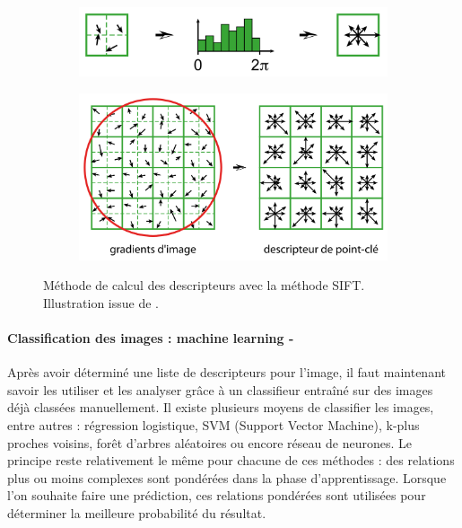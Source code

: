\documentclass[a4paper, 11pt]{article}
\begin{document}
		\begin{figure}\centering
			\begin{subfigure}[c]{.45\linewidth}
				\includegraphics[width=\linewidth]{SIFT-descr02.png}
				\caption{}
			\end{subfigure}
		\begin{subfigure}[c]{.3\linewidth}
			\includegraphics[width=\linewidth]{SIFT-descr01.png}
			\caption{}
		\end{subfigure}
			\caption{\label{fig:sift-descr}Méthode de calcul des descripteurs avec la méthode SIFT. Illustration issue de \cite{frwiki:177813849}.}
		\end{figure}
		\paragraph{Classification des images : machine learning -}
		Après avoir déterminé une liste de descripteurs pour l'image, il faut maintenant savoir les utiliser et les analyser grâce à un classifieur entraîné sur des images déjà classées manuellement. Il existe plusieurs moyens de classifier les images, entre autres : régression logistique, SVM (Support Vector Machine), k-plus proches voisins, forêt d'arbres aléatoires ou encore réseau de neurones. Le principe reste relativement le même pour chacune de ces méthodes : des relations plus ou moins complexes sont pondérées dans la phase d'apprentissage. Lorsque l'on souhaite faire une prédiction, ces relations pondérées sont utilisées pour déterminer la meilleure probabilité du résultat.
\end{document}
